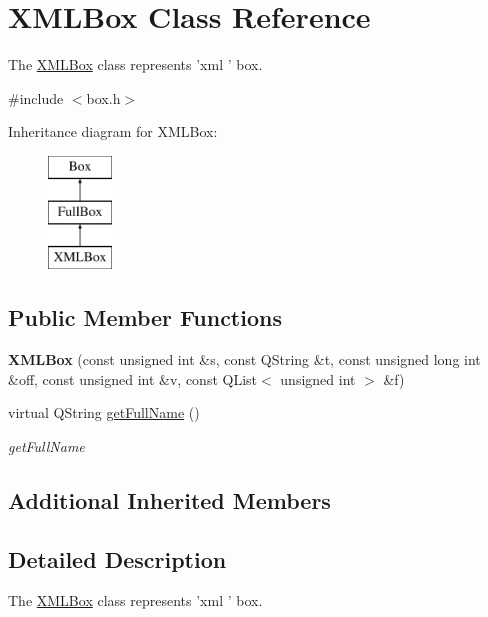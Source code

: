 \hypertarget{class_x_m_l_box}{\section{X\-M\-L\-Box Class Reference}
\label{class_x_m_l_box}
}


The \hyperlink{class_x_m_l_box}{X\-M\-L\-Box} class represents 'xml ' box.  




{\ttfamily \#include $<$box.\-h$>$}

Inheritance diagram for X\-M\-L\-Box\-:\begin{figure}[H]
\begin{center}
\leavevmode
\includegraphics[height=3.000000cm]{class_x_m_l_box}
\end{center}
\end{figure}
\subsection*{Public Member Functions}
\begin{DoxyCompactItemize}
\item 
\hypertarget{class_x_m_l_box_a0cc67f770226e45a1eca9ce8e247121b}{{\bfseries X\-M\-L\-Box} (const unsigned int \&s, const Q\-String \&t, const unsigned long int \&off, const unsigned int \&v, const Q\-List$<$ unsigned int $>$ \&f)}\label{class_x_m_l_box_a0cc67f770226e45a1eca9ce8e247121b}

\item 
virtual Q\-String \hyperlink{class_x_m_l_box_a430688e22c69256bfc823b979a5060c9}{get\-Full\-Name} ()
\begin{DoxyCompactList}\small\item\em get\-Full\-Name \end{DoxyCompactList}\end{DoxyCompactItemize}
\subsection*{Additional Inherited Members}


\subsection{Detailed Description}
The \hyperlink{class_x_m_l_box}{X\-M\-L\-Box} class represents 'xml ' box. 

